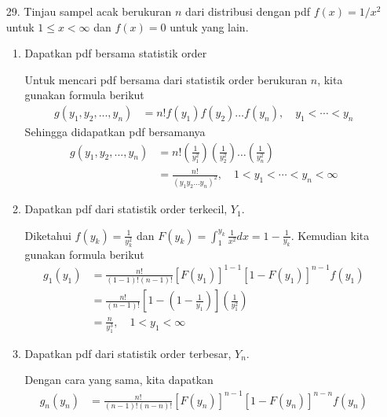 \documentclass{exam}
\begin{document}
\begin{enumerate}
        \item [29.] Tinjau sampel acak berukuran $n$ dari distribusi dengan pdf $f(x)=1/x^2$ untuk $1\leq x<\infty$ dan $f(x)=0$ untuk yang lain.
        \begin{enumerate}
            \item Dapatkan pdf bersama statistik order
            \begin{solution}
                Untuk mencari pdf bersama dari statistik order berukuran $n$, kita gunakan formula berikut
                \begin{align*}
                    g(y_1,y_2,...,y_n) &= n!f(y_1)f(y_2)\dots f(y_n),\quad y_1<\cdots<y_n
                \end{align*}
                Sehingga didapatkan pdf bersamanya
                \begin{align*}
                    g(y_1,y_2,...,y_n) &= n!\left(\frac{1}{y_1^2}\right)\left(\frac{1}{y_2^2}\right)\dots\left(\frac{1}{y_n^2}\right)\\
                    &=\frac{n!}{\left(y_1y_2\dots y_n\right)^2},\quad 1<y_1<\cdots<y_n<\infty
                \end{align*}
            \end{solution}
            \item Dapatkan pdf dari statistik order terkecil, $Y_1$.
            \begin{solution}
                Diketahui $\displaystyle f(y_k)=\frac{1}{y_k^2}$ dan $\displaystyle F(y_k)=\int_{1}^{y_k}\frac{1}{x^2}dx=1-\frac{1}{y_k}$. Kemudian kita gunakan formula berikut
                \begin{align*}
                    g_1(y_1) &= \frac{n!}{(1-1)!(n-1)!}[F(y_1)]^{1-1}[1-F(y_1)]^{n-1}f(y_1)\\
                    &= \frac{n!}{(n-1)!}\left[1-\left(1-\frac{1}{y_1}\right)\right]\left(\frac{1}{y_1^2}\right)\\
                    &= \frac{n}{y_1^3},\quad 1<y_1<\infty
                \end{align*}
            \end{solution}
            \item Dapatkan pdf dari statistik order terbesar, $Y_n$.
            \begin{solution}
                Dengan cara yang sama, kita dapatkan
                \begin{align*}
                    g_n(y_n) &= \frac{n!}{(n-1)!(n-n)!}[F(y_n)]^{n-1}[1-F(y_n)]^{n-n}f(y_n)\\

\end{align*}
\end{solution}
\end{enumerate}
\end{enumerate}
\end{document}
